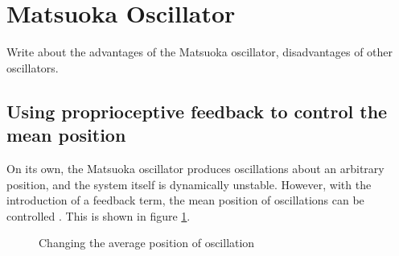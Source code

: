 \documentclass[12pt,twoside]{article}
\theoremstyle{plain}
\theoremstyle{definition}
\theoremstyle{remark}
\begin{document}
\section{Matsuoka Oscillator}
Write about the advantages of the Matsuoka oscillator, disadvantages of other oscillators.
\label{sec:Matsuoka_Oscillator}

\pagebreak

\subsection{Using proprioceptive feedback to control the mean position}
On its own, the Matsuoka oscillator produces oscillations about an arbitrary position, and the system itself is dynamically unstable. However, with the introduction of a feedback term, the mean position of oscillations can be controlled \cite{ronsse2009computational}. This is shown in figure \ref{fig:change-avg-pos}.

\begin{figure}[htbp]
\centering     %
{}
\caption{Changing the average position of oscillation}
\label{fig:change-avg-pos}
\end{figure}
\end{document}
